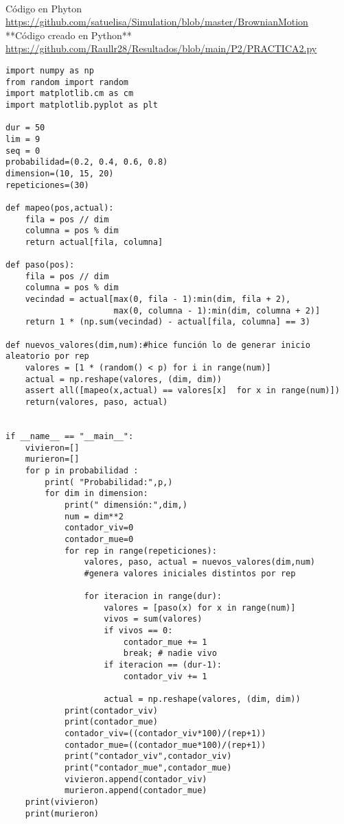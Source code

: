 \documentclass{article}
\begin{document}
\\ Código en Phyton 
\\\url{https://github.com/satuelisa/Simulation/blob/master/BrownianMotion}\\
**Código creado en Python**\\
\url{https://github.com/Raullr28/Resultados/blob/main/P2/PRACTICA2.py}
\begin{verbatim}
import numpy as np 
from random import random
import matplotlib.cm as cm
import matplotlib.pyplot as plt

dur = 50
lim = 9
seq = 0
probabilidad=(0.2, 0.4, 0.6, 0.8)
dimension=(10, 15, 20)
repeticiones=(30)

def mapeo(pos,actual):
    fila = pos // dim
    columna = pos % dim
    return actual[fila, columna]

def paso(pos):
    fila = pos // dim
    columna = pos % dim
    vecindad = actual[max(0, fila - 1):min(dim, fila + 2),
                      max(0, columna - 1):min(dim, columna + 2)]
    return 1 * (np.sum(vecindad) - actual[fila, columna] == 3)

def nuevos_valores(dim,num):#hice función lo de generar inicio aleatorio por rep
    valores = [1 * (random() < p) for i in range(num)]
    actual = np.reshape(valores, (dim, dim))
    assert all([mapeo(x,actual) == valores[x]  for x in range(num)])
    return(valores, paso, actual)


if __name__ == "__main__":
    vivieron=[]
    murieron=[]
    for p in probabilidad :
        print( "Probabilidad:",p,)
        for dim in dimension:
            print(" dimensión:",dim,)
            num = dim**2
            contador_viv=0
            contador_mue=0
            for rep in range(repeticiones):
                valores, paso, actual = nuevos_valores(dim,num)
                #genera valores iniciales distintos por rep
                
                for iteracion in range(dur):
                    valores = [paso(x) for x in range(num)]
                    vivos = sum(valores)
                    if vivos == 0:
                        contador_mue += 1
                        break; # nadie vivo
                    if iteracion == (dur-1):
                        contador_viv += 1
                        
                    actual = np.reshape(valores, (dim, dim))
            print(contador_viv)
            print(contador_mue)
            contador_viv=((contador_viv*100)/(rep+1))
            contador_mue=((contador_mue*100)/(rep+1))
            print("contador_viv",contador_viv)
            print("contador_mue",contador_mue)
            vivieron.append(contador_viv)
            murieron.append(contador_mue)
    print(vivieron)
    print(murieron)


\end{verbatim}
\end{document}
